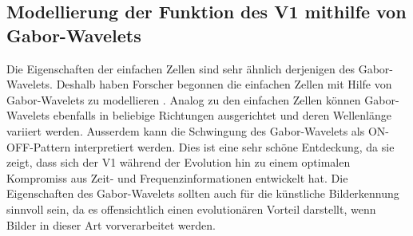 \subsection{Modellierung der Funktion des V1 mithilfe von Gabor-Wavelets}

Die Eigenschaften der einfachen Zellen sind sehr ähnlich derjenigen des Gabor-Wavelets.
Deshalb haben Forscher begonnen die einfachen Zellen mit Hilfe von Gabor-Wavelets zu modellieren \cite{paper:imgrep}.
Analog zu den einfachen Zellen können Gabor-Wavelets ebenfalls in beliebige Richtungen ausgerichtet und deren Wellenlänge variiert werden.
Ausserdem kann die Schwingung des Gabor-Wavelets als ON-OFF-Pattern interpretiert werden.
Dies ist eine sehr schöne Entdeckung, da sie zeigt, dass sich der V1 während der Evolution hin zu einem optimalen Kompromiss aus Zeit- und Frequenzinformationen entwickelt hat.
Die Eigenschaften des Gabor-Wavelets sollten auch für die künstliche Bilderkennung sinnvoll sein, da es offensichtlich einen evolutionären Vorteil darstellt, wenn Bilder in dieser Art vorverarbeitet werden.
